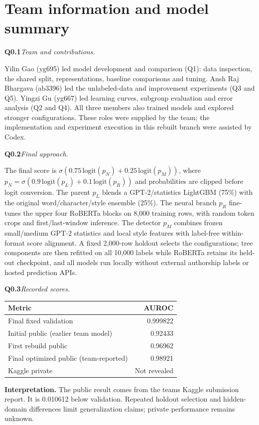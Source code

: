 \documentclass[10pt,letterpaper]{article}
\newcommand{\q}[2]{\needspace{4\baselineskip}\par\addvspace{7pt}\textbf{#1}\quad\textit{#2}\par\nobreak}
\begin{document}
\section*{Team information and model summary}
\q{Q0.1}{Team and contributions.}Yilin Gao (yg695) led model development and comparison (Q1): data inspection, the shared split, representations, baseline comparisons and tuning. Ansh Raj Bhargava (ab3396) led the unlabeled-data and improvement experiments (Q3 and Q5). Yingzi Gu (yg667) led learning curves, subgroup evaluation and error analysis (Q2 and Q4). All three members also trained models and explored stronger configurations. These roles were supplied by the team; the implementation and experiment execution in this rebuilt branch were assisted by Codex.
\q{Q0.2}{Final approach.}
The final score is $\sigma(0.75\,\mathrm{logit}(p_N)+0.25\,\mathrm{logit}(p_M))$, where $p_N=\sigma(0.9\,\mathrm{logit}(p_L)+0.1\,\mathrm{logit}(p_R))$ and probabilities are clipped before logit conversion.
The parent $p_L$ blends a GPT-2/statistics LightGBM (75\%) with the original word/character/style ensemble (25\%).
The neural branch $p_R$ fine-tunes the upper four RoBERTa blocks on 8,000 training rows, with random token crops and first/last-window inference.
The detector $p_M$ combines frozen small/medium GPT-2 statistics and local style features with label-free within-format score alignment.
A fixed 2,000-row holdout selects the configurations; tree components are then refitted on all 10,000 labels while RoBERTa retains its held-out checkpoint, and all models run locally without external authorship labels or hosted prediction APIs.
\q{Q0.3}{Recorded scores.}
\par\noindent
\begin{tabularx}{\linewidth}{@{}Yr@{}}
\toprule
Metric & AUROC \\ \midrule
Final fixed validation & 0.999822 \\
Initial public (earlier team model) & 0.92433 \\
First rebuild public & 0.96962 \\
Final optimized public (team-reported) & 0.98921 \\
Kaggle private & Not revealed \\
\bottomrule
\end{tabularx}

\par
\textbf{Interpretation.} The public result comes from the team\textquotesingle s Kaggle submission report. It is 0.010612 below validation. Repeated holdout selection and hidden-domain differences limit generalization claims; private performance remains unknown.
\newpage
\end{document}
